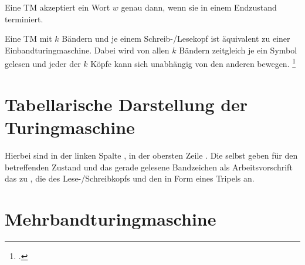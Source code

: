 \documentclass{lehramt-informatik-haupt}
\begin{document}
Eine TM akzeptiert ein Wort $w$ genau dann, wenn sie in einem
Endzustand terminiert.

Eine TM mit $k$ Bändern und je einem Schreib-/Lesekopf ist
äquivalent zu einer Einbandturingmaschine. Dabei wird von allen $k$
Bändern zeitgleich je ein Symbol gelesen und jeder der $k$ Köpfe
kann sich unabhängig von den anderen bewegen.
\footcite[Seite 26]{theo:fs:3}

\section{Tabellarische Darstellung der Turingmaschine}

Hierbei sind in der linken Spalte , in der obersten Zeile . Die  selbst geben für den
betreffenden Zustand und das gerade gelesene Bandzeichen als
Arbeitsvorschrift das zu , die
 des Lese-/Schreibkopfs und den 
in Form eines Tripels an.


\section{Mehrbandturingmaschine}

\literatur
\end{document}
